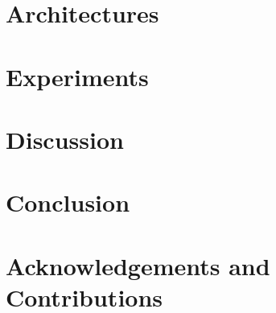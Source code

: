 \documentclass[10pt, conference, compsocconf]{IEEEtran}
\begin{document}
\section{Architectures}
\label{sec:pilot_harvester_overview}


\section{Experiments}
\label{sec:experiments}


\section{Discussion}
\label{sec:discussion}


\section{Conclusion}
\label{sec:conclusion}


\section{Acknowledgements and Contributions}
\label{sec:ack}





\end{document}
